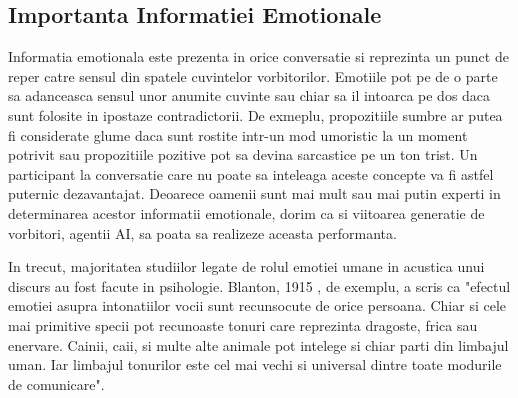 \documentclass[a4paper,12pt]{book}
\begin{document}
			\subsection{Importanta Informatiei Emotionale}
				Informatia emotionala este prezenta in orice conversatie si reprezinta un punct de reper catre sensul din spatele cuvintelor vorbitorilor. Emotiile pot pe de o parte sa adanceasca sensul unor anumite cuvinte sau chiar sa il intoarca pe dos daca sunt folosite in ipostaze contradictorii. De exmeplu, propozitiile sumbre ar putea fi considerate glume daca sunt rostite intr-un mod umoristic la un moment potrivit sau propozitiile pozitive pot sa devina sarcastice pe un ton trist. Un participant la conversatie care nu poate sa inteleaga aceste concepte va fi astfel puternic dezavantajat. Deoarece oamenii sunt mai mult sau mai putin experti in determinarea acestor informatii emotionale, dorim ca si viitoarea generatie de vorbitori, agentii AI, sa poata sa realizeze aceasta performanta.\par
				In trecut, majoritatea studiilor legate de rolul emotiei umane in acustica 	unui discurs au fost facute in psihologie. Blanton, 1915 \cite{blanton}, de exemplu, a scris ca "efectul emotiei asupra intonatiilor vocii sunt recunsocute de orice persoana. Chiar si cele mai primitive specii pot recunoaste tonuri care reprezinta dragoste, frica sau enervare. Cainii, caii, si multe alte animale pot intelege si chiar parti din limbajul uman. Iar limbajul tonurilor este cel mai vechi si universal dintre toate modurile de comunicare".\par 
\end{document}
